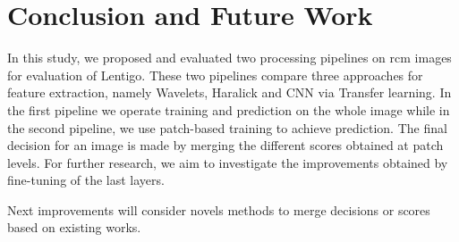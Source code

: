 \section{Conclusion and Future Work}
\label{conclusion}
In this study, we proposed and evaluated two processing pipelines on \ac{rcm} images for evaluation of Lentigo. These two pipelines compare three approaches for feature extraction, namely Wavelets, Haralick and CNN via Transfer learning. In the first pipeline we operate training and prediction on the whole image while in the second pipeline, we use patch-based training to achieve prediction. The final decision for an image is made by merging the different scores obtained at patch levels. For further research, we aim to investigate the improvements obtained by fine-tuning of the last layers.\par
Next improvements will consider novels methods to merge decisions or scores based on existing works.\par